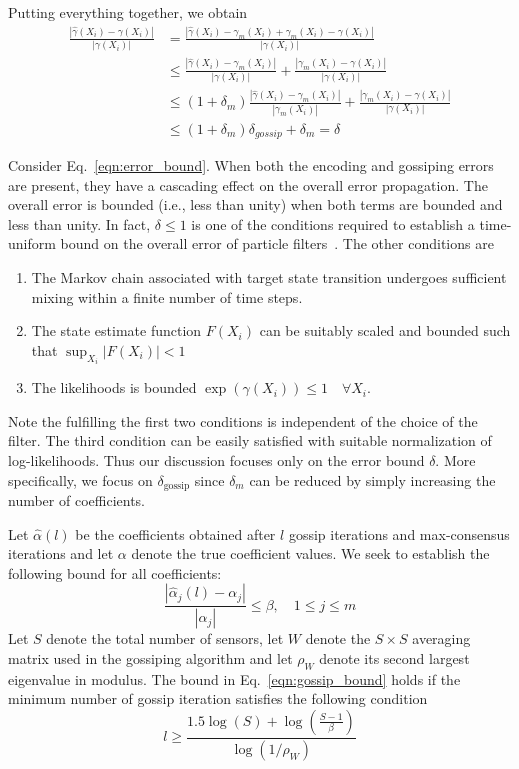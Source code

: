 \documentclass[10pt,letterpaper,final]{article}
\begin{document}
Putting everything together, we obtain
\begin{align}
\frac{|\hat{\gamma}(X_i) - \gamma(X_i)|}{|\gamma(X_i)|}&=\frac{|\hat{\gamma}(X_i) -\gamma_m(X_i) + \gamma_m(X_i) - \gamma(X_i)|}{|\gamma(X_i)|} \\
&\leq \frac{|\hat{\gamma}(X_i) -\gamma_m(X_i)|}{|\gamma(X_i)|}+\frac{|\gamma_m(X_i) - \gamma(X_i)|}{|\gamma(X_i)|} \\
&\leq (1+\delta_m)\frac{|\hat{\gamma}(X_i) -\gamma_m(X_i)|}{|\gamma_m(X_i)|}+\frac{|\gamma_m(X_i) - \gamma(X_i)|}{|\gamma(X_i)|} \\
&\leq (1+\delta_m)\delta_{gossip} + \delta_m  = \delta
\label{eqn:error_bound}
\end{align}

Consider Eq.~\eqref{eqn:error_bound}. When both the encoding and gossiping errors are present, they have a cascading effect on the overall error propagation. The overall error is bounded (i.e., less than unity) when both terms are bounded and less than unity. In fact, $\delta\leq 1$ is one of the conditions required to establish a time-uniform bound on the overall error of particle filters~\cite{Syamantak2015}. The other conditions are
\begin{enumerate}
\item The Markov chain associated with target state transition undergoes sufficient mixing within a finite number of time steps. 
\item The state estimate function $F(X_i)$ can be suitably scaled and bounded such that $\sup_{X_i} |F(X_i)|<1$
\item The likelihoods is bounded $\exp(\gamma(X_i))\leq 1 \quad \forall X_i$. 
\end{enumerate}
Note the fulfilling the first two conditions is independent of the choice of the filter. The third condition can be easily satisfied with suitable normalization of log-likelihoods. Thus  our discussion focuses only on the error bound $\delta$. More specifically, we focus on $\delta_{\text{gossip}}$ since $\delta_m$ can be reduced by simply increasing the number of coefficients. 

Let $\hat{\alpha}(l)$ be the coefficients obtained after $l$ gossip iterations and max-consensus iterations and let $\alpha$ denote the true coefficient values. We seek to establish the following bound for all coefficients:
\begin{equation}
\frac{|\hat{\alpha}_j(l)-\alpha_j|}{|\alpha_j|}\leq \beta, \quad 1\leq j\leq m
\label{eqn:gossip_bound}
\end{equation}
Let $S$ denote the total number of sensors, let $W$ denote the $S\times S$ averaging matrix used in the gossiping algorithm and let $\rho_W$ denote its second largest eigenvalue in modulus. The bound in Eq.~\eqref{eqn:gossip_bound} holds if the minimum number of gossip iteration satisfies the following condition~\cite{Olshevsky2009}
\begin{equation}
l\geq \frac{1.5\log(S)+\log(\frac{S-1}{\beta})}{\log(1/\rho_W)}
\label{eqn:minimum_NGossip}
\end{equation}
\end{document}
